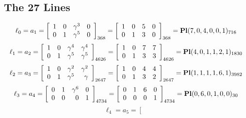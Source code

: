 \documentclass{article}
\begin{document}
{\subsection*{The 27 Lines}
$$
\ell_{0} = a_{1} = 
\left[
\begin{array}{*{4}{r}}
1 & 0 & \gamma^{3} & 0\\
0 & 1 & \gamma^{5} & 0\\
\end{array}
\right]
_{368}
=
\left[
\begin{array}{*{4}c}
1  & 0  & 5  & 0\\
0  & 1  & 3  & 0\\
\end{array}
\right]_{368}
={\rm\bf Pl}(7,0,4,0,0,1 )_{716}$$
$$
\ell_{1} = a_{2} = 
\left[
\begin{array}{*{4}{r}}
1 & 0 & \gamma^{4} & \gamma^{4}\\
0 & 1 & \gamma^{5} & \gamma^{5}\\
\end{array}
\right]
_{4626}
=
\left[
\begin{array}{*{4}c}
1  & 0  & 7  & 7\\
0  & 1  & 3  & 3\\
\end{array}
\right]_{4626}
={\rm\bf Pl}(4,0,1,1,2,1 )_{1830}$$
$$
\ell_{2} = a_{3} = 
\left[
\begin{array}{*{4}{r}}
1 & 0 & \gamma^{2} & \gamma^{2}\\
0 & 1 & \gamma^{5} & \gamma \\
\end{array}
\right]
_{2647}
=
\left[
\begin{array}{*{4}c}
1  & 0  & 4  & 4\\
0  & 1  & 3  & 2\\
\end{array}
\right]_{2647}
={\rm\bf Pl}(1,1,1,1,6,1 )_{3982}$$
$$
\ell_{3} = a_{4} = 
\left[
\begin{array}{*{4}{r}}
0 & 1 & \gamma^{6} & 0\\
0 & 0 & 0 & 1\\
\end{array}
\right]
_{4734}
=
\left[
\begin{array}{*{4}c}
0  & 1  & 6  & 0\\
0  & 0  & 0  & 1\\
\end{array}
\right]_{4734}
={\rm\bf Pl}(0,6,0,1,0,0 )_{30}$$
$$
\ell_{4} = a_{5} = 
\left[
\begin{array}{*{4}{r}}

\end{array}$$}
\end{document}
